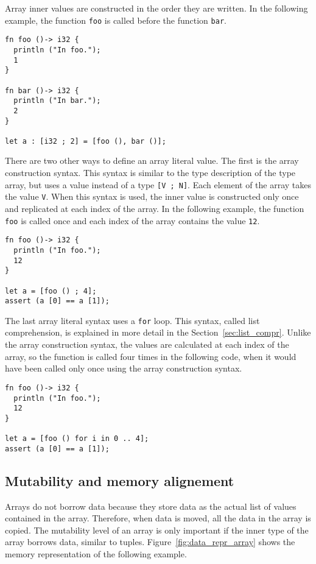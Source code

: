 Array inner values are constructed in the order they are written. In the
following example, the function \texttt{foo} is called before the function
\texttt{bar}.

\begin{lstlisting}[style=coloredverbatim]
fn foo ()-> i32 {
  println ("In foo.");
  1
}

fn bar ()-> i32 {
  println ("In bar.");
  2
}

let a : [i32 ; 2] = [foo (), bar ()];
\end{lstlisting}

There are two other ways to define an array literal value. The first is the
array construction syntax. This syntax is similar to the type description of the
type array, but uses a value instead of a type \texttt{[V ; N]}. Each element of
the array takes the value \texttt{V}. When this syntax is used, the inner value
is constructed only once and replicated at each index of the array. In the
following example, the function \texttt{foo} is called once and each index of
the array contains the value \texttt{12}.

\begin{lstlisting}[style=coloredverbatim]
fn foo ()-> i32 {
  println ("In foo.");
  12
}

let a = [foo () ; 4];
assert (a [0] == a [1]);
\end{lstlisting}

\smallskip
The last array literal syntax uses a \texttt{for} loop. This syntax, called list
comprehension, is explained in more detail in the Section~\ref{sec:list_compr}.
Unlike the array construction syntax, the values are calculated at each index of
the array, so the function is called four times in the following code, when it
would have been called only once using the array construction syntax.

\begin{lstlisting}[style=coloredverbatim]
fn foo ()-> i32 {
  println ("In foo.");
  12
}

let a = [foo () for i in 0 .. 4];
assert (a [0] == a [1]);
\end{lstlisting}


\subsection {Mutability and memory alignement}
Arrays do not borrow data because they store data as the actual list of values
contained in the array. Therefore, when data is moved, all the data in the array
is copied. The mutability level of an array is only important if the inner type
of the array borrows data, similar to tuples. Figure~\ref{fig:data_repr_array}
shows the memory representation of the following example.

